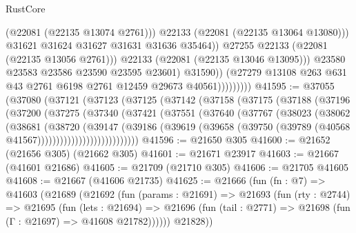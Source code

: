 \begin{lexlean}{RustCore}
\begin{coremodule}
                                      (@22081 (@22135 @13074 @2761)))
                                    @22133
                                    (@22081 (@22135 @13064 @13080)))
                                  @31621
                                  @31624
                                  @31627
                                  @31631
                                  @31636
                                  @35464))
                              @27255
                              @22133
                              (@22081 (@22135 @13056 @2761)))
                            @22133
                            (@22081 (@22135 @13046 @13095)))
                          @23580
                          @23583
                          @23586
                          @23590
                          @23595
                          @23601)
                        @31590))
                    (@27279 @13108 @263 @631 @43 @2761 @6198 @2761 @12459 @29673 @40561)))))))))
@41595 := @37055
    (@37080
      (@37121
        (@37123
          (@37125
            (@37142
              (@37158
                (@37175
                  (@37188
                    (@37196
                      (@37200
                        (@37275
                          (@37340
                            (@37421
                              (@37551
                                (@37640
                                  (@37767
                                    (@38023
                                      (@38062
                                        (@38681
                                          (@38720
                                            (@39147
                                              (@39186
                                                (@39619
                                                  (@39658
                                                    (@39750
                                                      (@39789
                                                        (@40568 @41567)))))))))))))))))))))))))))
@41596 := @21650 @305
@41600 := @21652 (@21656 @305) (@21662 @305)
@41601 := @21671 @23917
@41603 := @21667 (@41601 @21686)
@41605 := @21709 (@21710 @305)
@41606 := @21705 @41605
@41608 := @21667 (@41606 @21735)
@41625 := @21666
    (fun (fn : @7) =>
    @41603
      (@21689
        (@21692
          (fun (params : @21691) =>
          @21693
            (fun (rty : @2744) =>
            @21695
              (fun (lets : @21694) =>
              @21696 (fun (tail : @2771) => @21698 (fun (Γ : @21697) => @41608 @21782))))))
        @21828))

\end{coremodule}
\end{lexlean}

